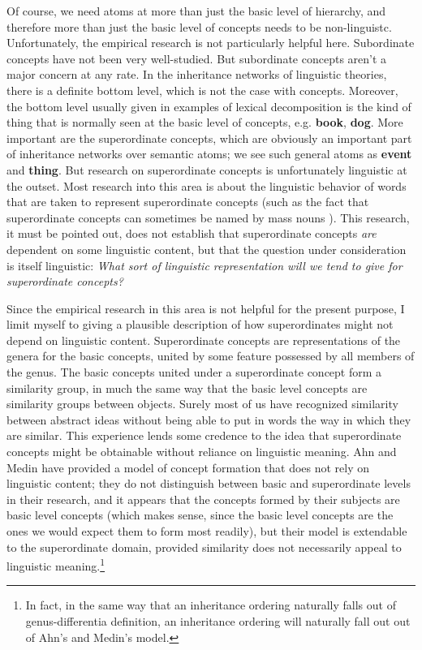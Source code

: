 Of course, we need atoms at more than just the basic level of hierarchy, and therefore more than just the basic level of concepts needs to be non-linguistc. Unfortunately, the empirical research is not particularly helpful here. Subordinate concepts have not been very well-studied. But subordinate concepts aren't a major concern at any rate. In the inheritance networks of linguistic theories, there is a definite bottom level, which is not the case with concepts. Moreover, the bottom level usually given in examples of lexical decomposition is the kind of thing that is normally seen at the basic level of concepts, e.g. {\bf book}, {\bf dog}. More important are the superordinate concepts, which are obviously an important part of inheritance networks over semantic atoms; we see such general atoms as {\bf event} and {\bf thing}. But research on superordinate concepts is unfortunately linguistic at the outset. Most research into this area is about the linguistic behavior of words that are taken to represent superordinate concepts (such as the fact that superordinate concepts can sometimes be named by mass nouns \cite{markman_why_1985}). This research, it must be pointed out, does not establish that superordinate concepts \emph{are} dependent on some linguistic content, but that the question under consideration is itself linguistic: \emph{What sort of linguistic representation will we tend to give for superordinate concepts?}

Since the empirical research in this area is not helpful for the present purpose, I limit myself to giving a plausible description of how superordinates might not depend on linguistic content. Superordinate concepts are representations of the genera for the basic concepts, united by some feature possessed by all members of the genus. The basic concepts united under a superordinate concept form a similarity group, in much the same way that the basic level concepts are similarity groups between objects. Surely most of us have recognized similarity between abstract ideas without being able to put in words the way in which they are similar. This experience lends some credence to the idea that superordinate concepts might be obtainable without reliance on linguistic meaning. Ahn and Medin \cite{ahn_two-stage_1990} \cite{medin_two-stage_1992} have provided a model of concept formation that does not rely on linguistic content; they do not distinguish between basic and superordinate levels in their research, and it appears that the concepts formed by their subjects are basic level concepts (which makes sense, since the basic level concepts are the ones we would expect them to form most readily), but their model is extendable to the superordinate domain, provided similarity does not necessarily appeal to linguistic meaning.\footnote{In fact, in the same way that an inheritance ordering naturally falls out of genus-differentia definition, an inheritance ordering will naturally fall out out of Ahn's and Medin's model.}


